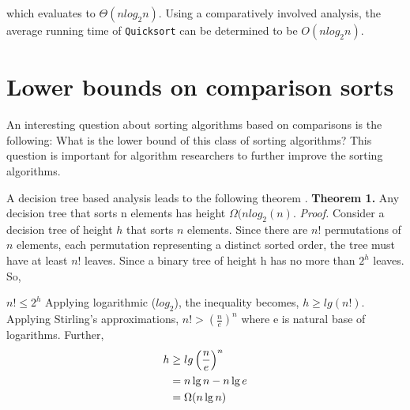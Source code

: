 \documentclass[10pt]{article}
\begin{document}
\begin{multicols*}{2}
which evaluates to $\Theta(n log_2 n)$. Using a comparatively
involved analysis, the average running time
of \texttt{Quicksort} can be determined to be $O(n log_2 n)$.

\section{Lower bounds on comparison
sorts}

An interesting question about sorting algorithms
based on comparisons is the following: What is
the lower bound of this class of sorting algorithms?
This question is important for algorithm
researchers to further improve the sorting algorithms. \par

A decision tree based analysis leads to the following
theorem \cite{cormen2009introduction}. 
\vspace{1em}
\newline
\textbf{Theorem 1.} Any decision tree that sorts n elements
has height $\Omega(nlog_2(n)$. 
\vspace{1em}
\newline
\textit{Proof.} Consider a decision tree of height $h$ that
sorts $n$ elements. Since there are $n!$ permutations
of $n$ elements, each permutation representing a distinct
sorted order, the tree must have at least $n!$
leaves. Since a binary tree of height h has no more
than $2^h$
leaves. So, \vspace{0.75em} 
\par
$n! \leq 2^h$ 
\vspace{1em}
\newline
Applying logarithmic ($log_2$), the inequality becomes, 
\vspace{0.75em}
\newline
$h \geq lg(n!).$ 
\vspace{1em}
\newline
Applying Stirling’s approximations, 
\vspace{1em}
\newline
$n! > \left (  \frac{n}{e} \right )^n$ 
\vspace{1em}
\newline
where e is natural base of logarithms. Further,
\vspace{1em}
\begin{align*}
h &\geq lg \left ( \frac{n}{e} \right )^n \\ \vspace{1.5em}
&= n \lg n - n \lg e \\ \vspace{1.5em}
&= \Omega(n \lg n)
\end{align*}


\end{multicols*}
\end{document}
